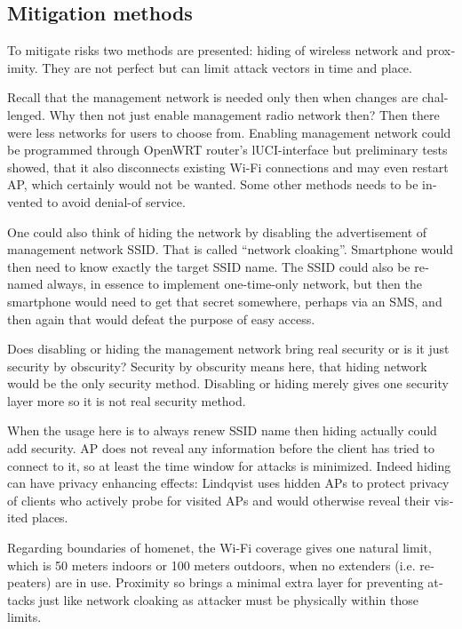 \documentclass[12pt,a4paper,english]{tutthesis}
\begin{document}
\begin{otherlanguage}{english}
\section{Mitigation methods}
\label{sec-6-9}
To mitigate risks two methods are presented: hiding of
wireless network and proximity. They are not perfect but can
limit attack vectors in time and place.


Recall that the management network is needed only then when changes
are challenged. Why then not just enable management radio network
then? Then there were less networks for users to choose from.
Enabling management network could be programmed through OpenWRT router's 
lUCI-interface but preliminary tests showed, that it also 
disconnects existing Wi-Fi connections and may even restart AP,
which certainly would not be wanted. Some other methods needs to
be invented to avoid denial-of service.

\label{tag:hidessid}
One could also think of hiding the network by disabling the
advertisement of management network SSID. That is called ``network
cloaking''.  Smartphone would then need to know exactly the target SSID name.
The SSID could also be renamed always, in essence
to implement one-time-only network, but then the smartphone would
need to get that secret somewhere, perhaps via an SMS, and then again
that would defeat the purpose of easy access.

Does disabling or hiding the management network bring real security or
is it just security by obscurity?  Security by obscurity means here,
that hiding network would be the only security method.
Disabling or hiding  merely gives one security layer more so it is not
real security method.

When the usage here is to always renew SSID name then
hiding actually could add security. AP does not reveal any information
before the client has tried to connect to it, so at least 
the time window for attacks is minimized. Indeed hiding can have
privacy enhancing effects: Lindqvist \cite{hidden-wlan} uses hidden APs
to protect privacy of clients who actively probe for visited APs and
would otherwise reveal their visited places.


Regarding boundaries of homenet, the Wi-Fi coverage gives 
one natural limit, which is 50 meters indoors or 100 meters outdoors,
when no extenders (i.e. repeaters) are in use.
Proximity so brings a minimal extra layer for preventing attacks
just like network cloaking as attacker must be physically within those limits.



\end{otherlanguage}
\end{document}
